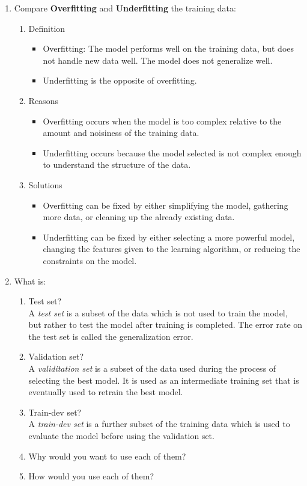 \documentclass[a4paper,10pt]{article}
\begin{document}
\begin{enumerate}
	\item Compare \textbf{Overfitting} and \textbf{Underfitting} the training data:
	\begin{enumerate}
		\item Definition
		\begin{itemize}
			\item Overfitting: The model performs well on the training data, but does not handle new data well. The model does not generalize well.
			\item Underfitting is the opposite of overfitting. 
		\end{itemize}
		\item Reasons
		\begin{itemize}
			\item Overfitting occurs when the model is too complex relative to the amount and noisiness of the training data.
			\item Underfitting occurs because the model selected is not complex enough to understand the structure of the data.
		\end{itemize}
		\item Solutions
		\begin{itemize}
			\item Overfitting can be fixed by either simplifying the model, gathering more data, or cleaning up the already existing data.
			\item Underfitting can be fixed by either selecting a more powerful model, changing the features given to the learning algorithm, or reducing the constraints on the model.
		\end{itemize}
	\end{enumerate}
	
	\item What is:
	\begin{enumerate}
		\item Test set? \\
		A \emph{test set} is a subset of the data which is not used to train the model, but rather to test the model after training is completed. The error rate on the test set is called the generalization error.
		\item Validation set? \\
		A \emph{validitation set} is a subset of the data used during the process of selecting the best model.
		It is used as an intermediate training set that is eventually used to retrain the best model.
		\item Train-dev set? \\
		A \emph{train-dev set} is a further subset of the training data which is used to evaluate the model before using the validation set.
		\item Why would you want to use each of them? 
		\item How would you use each of them? 
	\end{enumerate}
\end{enumerate}
	
\end{document}
